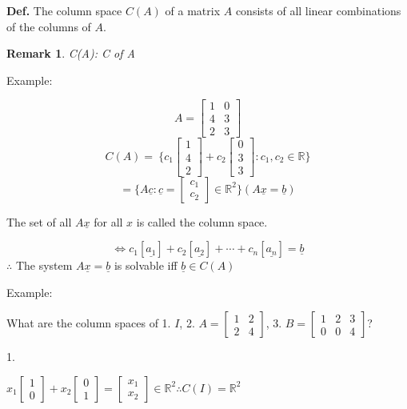 \documentclass[12pt,a4paper]{article}
\newtheorem*{rem}{Remark}
\newcommand{\Remark}[1]{
  \begin{rem}
    \color{cyan}
    #1
  \end{rem}
}
\begin{document}
\textbf{Def.} The column space $C(A)$ of a matrix $A$ consists of all linear combinations of the columns of $A$.

\Remark{C(A): C of A}

Example:

\[
  A = 
  \begin{bmatrix}
    1 & 0 \\
    4 & 3 \\
    2 & 3
  \end{bmatrix}
\]
\[
C(A) = \
\{
  c_1
  \begin{bmatrix}
    1 \\
    4 \\
    2
  \end{bmatrix}
  + c_2
  \begin{bmatrix}
    0 \\
    3 \\
    3
  \end{bmatrix}
  : c_1, c_2 \in \mathbb{R}
\}
\]
\[
= 
\{
  A\underline{c}: \underline{c} = 
  \begin{bmatrix}
    c_1 \\
    c_2
  \end{bmatrix} \in \mathbb{R}^2
\} (A\underline{x} = \underline{b})
\]

The set of all $A\underline{x}$ for all $x$ is called the column space.

$$\iff c_1[\underline{a_1}] + c_2[\underline{a_2}] + \cdots + c_n[\underline{a_n}]  = \underline{b}$$
$\therefore$ The system $A\underline{x} = \underline{b}$ is solvable iff $\underline{b} \in C(A)$

Example:

What are the column spaces of 1. $I$, 2.
$
A = 
\begin{bmatrix}
  1 & 2 \\
  2 & 4
\end{bmatrix}
$, 
3. 
$
B = 
\begin{bmatrix}
  1 & 2 & 3 \\
  0 & 0 & 4
\end{bmatrix}
$?

1. 

$
x_1
\begin{bmatrix}
  1 \\
  0
\end{bmatrix} + 
x_2
\begin{bmatrix}
  0 \\
  1
\end{bmatrix} = 
\begin{bmatrix}
  x_1 \\
  x_2
\end{bmatrix} \in \mathbb{R}^2
\therefore C(I) = \mathbb{R}^2
$
\end{document}
